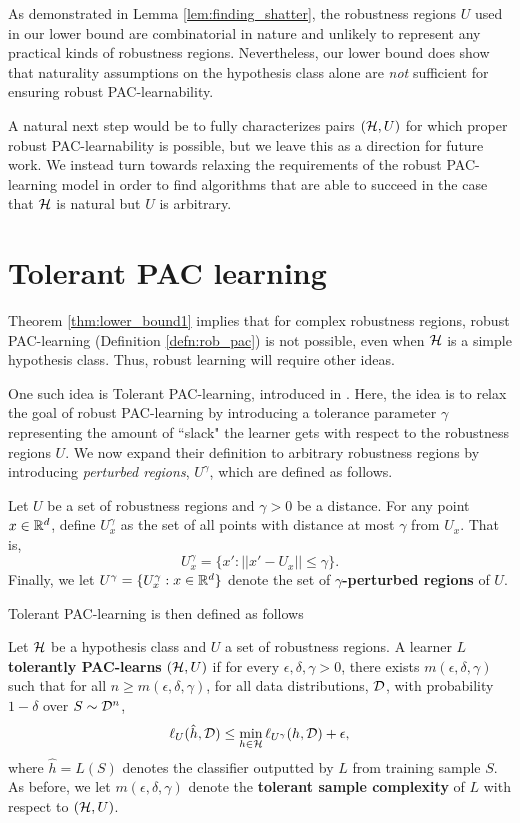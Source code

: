 As demonstrated in Lemma \ref{lem:finding_shatter}, the robustness regions $U$ used in our lower bound are combinatorial in nature and unlikely to represent any practical kinds of robustness regions. Nevertheless, our lower bound does show that naturality assumptions on the hypothesis class alone are \textit{not} sufficient for ensuring robust PAC-learnability.

A natural next step would be to fully characterizes pairs $(\mathcal H, U)$ for which proper robust PAC-learnability is possible, but we leave this as a direction for future work. We instead turn towards relaxing the requirements of the robust PAC-learning model in order to find algorithms that are able to succeed in the case that $\mathcal H$ is natural but $U$ is arbitrary. 

\section{Tolerant PAC learning}

Theorem \ref{thm:lower_bound1} implies that for complex robustness regions, robust PAC-learning (Definition \ref{defn:rob_pac}) is not possible, even when $\mathcal H$ is a simple hypothesis class. Thus, robust learning will require other ideas.

One such idea is Tolerant PAC-learning, introduced in \citet{Urner22}. Here, the idea is to relax the goal of robust PAC-learning by introducing a tolerance parameter $\gamma$ representing the amount of ``slack" the learner gets with respect to the robustness regions $U$. We now expand their definition to arbitrary robustness regions by introducing \textit{perturbed regions}, $U^\gamma$, which are defined as follows.  

\begin{defn}
Let $U$ be a set of robustness regions and $\gamma > 0$ be a distance. For any point $x \in \mathbb{R}^d$, define $U_x^\gamma$ as the set of all points with distance at most $\gamma$ from $U_x$. That is, $$U_x^\gamma = \{x': ||x' - U_x|| \leq \gamma\}.$$ Finally, we let $U^\gamma = \{U_x^{\gamma}: x \in \mathbb{R}^d\}$ denote the set of \textbf{$\gamma$-perturbed regions} of $U$. 
\end{defn}

Tolerant PAC-learning is then defined as follows
\begin{defn}\label{defn:tol_pac}
Let $\mathcal H$ be a hypothesis class and $U$ a set of robustness regions. A learner $L$ \textbf{tolerantly PAC-learns} $(\mathcal H, U)$ if for every  $\epsilon, \delta, \gamma > 0$, there exists $m(\epsilon, \delta, \gamma)$ such that for all $n \geq m(\epsilon, \delta, \gamma)$, for all data distributions, $\mathcal D$, with probability $1-\delta$ over $S \sim \mathcal D^n$, $$\ell_U(\hat{h}, \mathcal D) \leq \min_{h \in \mathcal H} \ell_{U^\gamma}(h, \mathcal D) + \epsilon,$$ where $\hat{h} = L(S)$ denotes the classifier outputted by $L$ from training sample $S$. As before, we let $m(\epsilon, \delta, \gamma)$ denote the \textbf{tolerant sample complexity} of $L$ with respect to $(\mathcal H, U)$. 
\end{defn}

